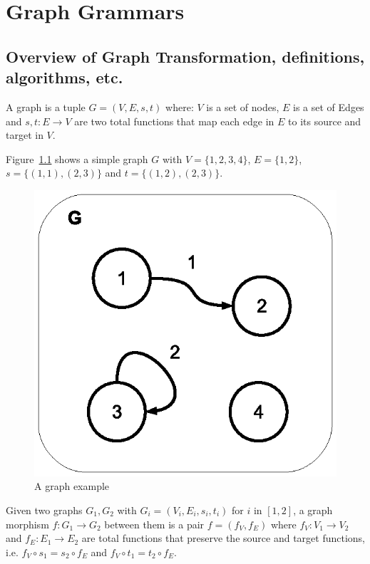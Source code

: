 \chapter{Graph Grammars}

\section{Overview of Graph Transformation, definitions, algorithms, etc.}

\begin{definition}[Graph] A graph is a tuple $G = \left(V,E,s,t\right)$ where: $V$ is a set of nodes, $E$ is a set of Edges and $s,t : E \rightarrow V$ are two total functions that map each edge in $E$ to its source and target in $V$.

\end{definition}

\begin{example}[Graph] Figure~\ref{fig:gts:graph} shows a simple graph $G$ with $V = \{1,2,3,4\}$, $E = \{1,2\}$, $s =\{(1,1),(2,3)\}$ and $t = \{(1,2),(2,3)\}$.
\begin{figure}[!ht]
  \centering
  \includegraphics[scale=0.8]{images/gts/graph}
  \caption{A graph example}\label{fig:gts:graph}
\end{figure}
\end{example}

\begin{definition} Given two graphs $G_1,G_2$ with $G_i = \left(V_i, E_i, s_i, t_i\right)$ for $i$ in $[1,2]$, a graph morphism $f : G_1 \rightarrow G_2$ between them is a pair $f = \left(f_V,f_E\right)$ where $f_V : V_1 \rightarrow V_2$ and $f_E : E_1 \rightarrow E_2$ are total functions that preserve the source and target functions, i.e. $f_V \circ s_1 = s_2 \circ f_E$ and $f_V \circ t_1 = t_2 \circ f_E$.  
\end{definition}

